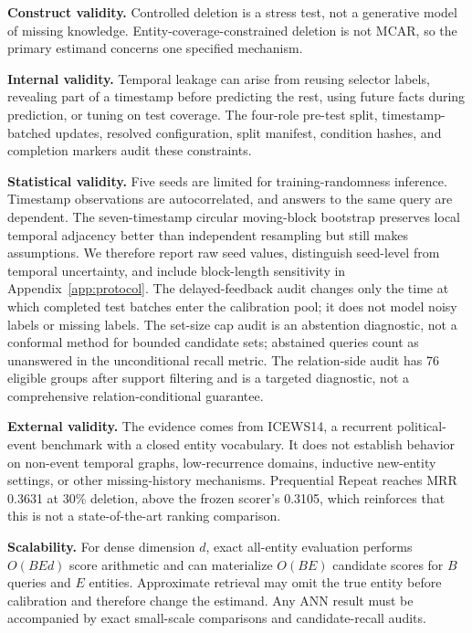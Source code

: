 \documentclass[10pt,twocolumn]{article}
\begin{document}
\textbf{Construct validity.}
Controlled deletion is a stress test, not a generative model of missing
knowledge. Entity-coverage-constrained deletion is not MCAR, so the primary
estimand concerns one specified mechanism.

\textbf{Internal validity.}
Temporal leakage can arise from reusing selector labels, revealing part of a
timestamp before predicting the rest, using future facts during prediction, or
tuning on test coverage. The four-role pre-test split, timestamp-batched
updates, resolved configuration, split manifest, condition hashes, and
completion markers audit these constraints.

\textbf{Statistical validity.}
Five seeds are limited for training-randomness inference. Timestamp
observations are autocorrelated, and answers to the same query are dependent.
The seven-timestamp circular moving-block bootstrap preserves local temporal
adjacency better than independent resampling but still makes assumptions. We
therefore report raw seed values, distinguish seed-level from temporal
uncertainty, and include block-length sensitivity in Appendix~\ref{app:protocol}.
The delayed-feedback audit changes only the time at which completed test
batches enter the calibration pool; it does not model noisy labels or missing
labels. The set-size cap audit is an abstention diagnostic, not a conformal
method for bounded candidate sets; abstained queries count as unanswered in the
unconditional recall metric. The relation-side audit has 76 eligible groups
after support filtering and is a targeted diagnostic, not a comprehensive
relation-conditional guarantee.

\textbf{External validity.}
The evidence comes from ICEWS14, a recurrent political-event benchmark with a
closed entity vocabulary. It does not establish behavior on non-event temporal
graphs, low-recurrence domains, inductive new-entity settings, or other
missing-history mechanisms. Prequential Repeat reaches MRR 0.3631 at 30\%
deletion, above the frozen scorer's 0.3105, which reinforces that this is not a
state-of-the-art ranking comparison.

\textbf{Scalability.}
For dense dimension \(d\), exact all-entity evaluation performs \(O(BEd)\)
score arithmetic and can materialize \(O(BE)\) candidate scores for \(B\)
queries and \(E\) entities. Approximate retrieval may omit the true entity
before calibration and therefore change the estimand. Any ANN result must be
accompanied by exact small-scale comparisons and candidate-recall audits.
\end{document}
